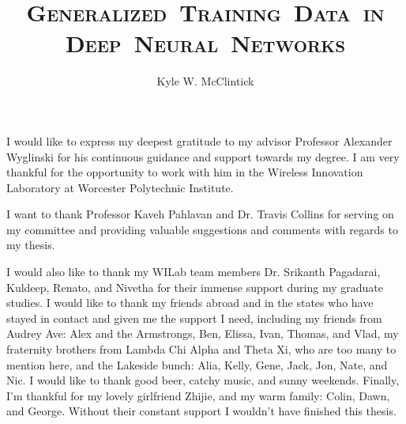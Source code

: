 \documentclass[11pt]{mvlthesis}
\title{\scshape \mbox{Generalized Training Data in}\\
\scshape \mbox{Deep Neural Networks}}
\author{Kyle W. McClintick}
\begin{document}
\maketitle
\begin{abstract}



\end{abstract}

\begin{frontmatter}
\begin{acknowledgements}
\begin{center}
\vspace{0.4in}
I would like to express my deepest gratitude to my advisor Professor Alexander Wyglinski for his continuous guidance and support towards my degree. I am very thankful for the opportunity to work with him in the Wireless Innovation Laboratory at Worcester Polytechnic Institute. 

I want to thank Professor Kaveh Pahlavan and Dr. Travis Collins for serving on my committee and providing valuable suggestions and comments with regards to my thesis. 

I would also like to thank my WILab team members Dr. Srikanth Pagadarai, Kuldeep, Renato, and Nivetha for their immense support during my graduate studies. I would like to thank my friends abroad and in the states who have stayed in contact and given me the support I need, including my friends from Audrey Ave: Alex and the Armstrongs, Ben, Elissa, Ivan, Thomas, and Vlad, my fraternity brothers from Lambda Chi Alpha and Theta Xi, who are too many to mention here, and the Lakeside bunch: Alia, Kelly, Gene, Jack, Jon, Nate, and Nic. I would like to thank good beer, catchy music, and sunny weekends. Finally, I'm thankful for my lovely girlfriend Zhijie, and my warm family: Colin, Dawn, and George. Without their constant support I wouldn't have finished this thesis.

\end{center}
\end{acknowledgements}

\tableofcontents
\listoffigures
\listoftables

\end{frontmatter}

\end{document}
